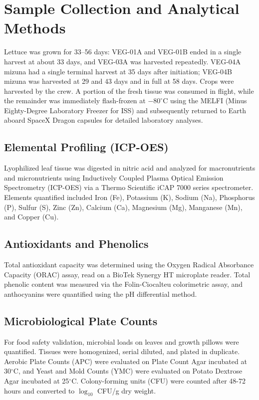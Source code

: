 \section{Sample Collection and Analytical Methods}
Lettuce was grown for 33--56 days: VEG-01A and VEG-01B ended in a single harvest at about 33 days, and VEG-03A was harvested repeatedly. VEG-04A mizuna had a single terminal harvest at 35 days after initiation; VEG-04B mizuna was harvested at 29 and 43 days and in full at 58 days. Crops were harvested by the crew. A portion of the fresh tissue was consumed in flight, while the remainder was immediately flash-frozen at $-80^\circ$C using the MELFI (Minus Eighty-Degree Laboratory Freezer for ISS) and subsequently returned to Earth aboard SpaceX Dragon capsules for detailed laboratory analyses.

\subsection{Elemental Profiling (ICP-OES)}
Lyophilized leaf tissue was digested in nitric acid and analyzed for macronutrients and micronutrients using Inductively Coupled Plasma Optical Emission Spectrometry (ICP-OES) via a Thermo Scientific iCAP 7000 series spectrometer. Elements quantified included Iron (Fe), Potassium (K), Sodium (Na), Phosphorus (P), Sulfur (S), Zinc (Zn), Calcium (Ca), Magnesium (Mg), Manganese (Mn), and Copper (Cu).

\subsection{Antioxidants and Phenolics}
Total antioxidant capacity was determined using the Oxygen Radical Absorbance Capacity (ORAC) assay, read on a BioTek Synergy HT microplate reader. Total phenolic content was measured via the Folin-Ciocalteu colorimetric assay, and anthocyanins were quantified using the pH differential method.

\subsection{Microbiological Plate Counts}
For food safety validation, microbial loads on leaves and growth pillows were quantified. Tissues were homogenized, serial diluted, and plated in duplicate. Aerobic Plate Counts (APC) were evaluated on Plate Count Agar incubated at 30$^\circ$C, and Yeast and Mold Counts (YMC) were evaluated on Potato Dextrose Agar incubated at 25$^\circ$C. Colony-forming units (CFU) were counted after 48-72 hours and converted to $\log_{10}$ CFU/g dry weight.

